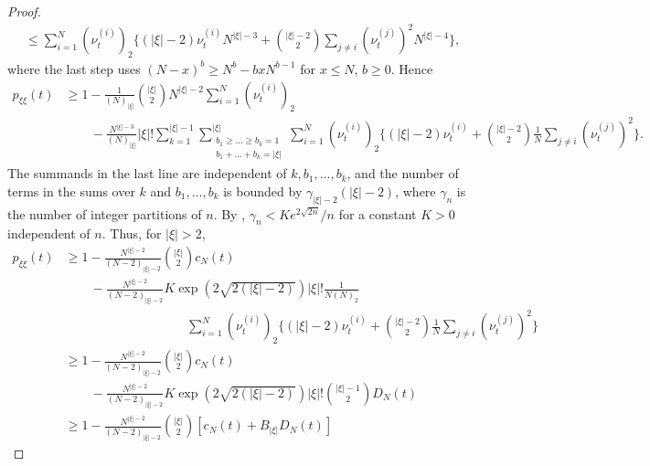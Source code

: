 \begin{proof}
\begin{align*}
&\leq \sum_{ i = 1 }^N ( \nu_t^{ ( i ) } )_2 \Bigg\{ ( | \xi | - 2 ) \nu_t^{ ( i ) } N^{ | \xi | - 3 } + \binom{ | \xi | - 2 }{ 2 } \sum_{ j \neq i } ( \nu_t^{ ( j ) } )^2 N^{ | \xi | - 4 } \Bigg\},
\end{align*}
where the last step uses $(N - x)^b \geq N^b - b x N^{ b - 1 }$ for $x \leq N$, $b \geq 0$.
Hence
\begin{align*}
p_{ \xi \xi }( t ) 
&\geq 1 - \frac{ 1 }{ ( N )_{ | \xi | } } \binom{|\xi|}{2}
        N^{ | \xi | - 2 } \sum_{ i = 1 }^N ( \nu_t^{ ( i ) } )_2 \\
    &\qquad- \frac{ N^{|\xi|-3} }{ ( N )_{ | \xi | } } |\xi|!
        \sum_{ k = 1 }^{ | \xi | - 1 } 
        \sum_{ \substack{ b_1 \geq \ldots \geq b_k = 1 
        \\ b_1 + \ldots + b_k = | \xi | } }^{ | \xi | } 
        \sum_{ i = 1 }^N ( \nu_t^{ ( i ) } )_2 
        \Bigg\{ ( | \xi | - 2 ) \nu_t^{ ( i ) } + \binom{ | \xi | - 2 }{ 2 } \frac{1}{N} 
        \sum_{ j \neq i } ( \nu_t^{ ( j ) } )^2 \Bigg\} .
\end{align*}
The summands in the last line are independent of $k, b_1, \dots, b_k$, and the number of terms in the sums over $k$ and $b_1, \dots, b_k$ is bounded by $\gamma_{|\xi|-2} (|\xi|-2)$, where $\gamma_n$ is the number of integer partitions of $n$.
By \textcite[Section 2]{hardy1918}, $\gamma_n < K e^{ 2 \sqrt{ 2 n } } / n$ for a constant $K > 0$ independent of $n$.
Thus, for $|\xi| > 2$,
\begin{align*}
p_{ \xi \xi }( t ) 
&\geq 1 - \frac{ N^{ | \xi | - 2 } }{ ( N-2 )_{ | \xi | -2} } \binom{|\xi|}{2}
        c_N(t) \\
    &\qquad- \frac{ N^{|\xi|-2} }{ ( N-2 )_{ | \xi | -2} }
        K \exp( 2 \sqrt{2(|\xi|-2)} ) |\xi|!
        \frac{1}{N(N)_2} \\
    &\hspace{4cm} \sum_{ i = 1 }^N ( \nu_t^{ ( i ) } )_2
        \Bigg\{ ( | \xi | - 2 ) \nu_t^{ ( i ) } + \binom{ | \xi | - 2 }{ 2 } \frac{1}{N} 
        \sum_{ j \neq i } ( \nu_t^{ ( j ) } )^2 \Bigg\} \\
&\geq 1 - \frac{ N^{ | \xi | - 2 } }{ ( N-2 )_{ | \xi | -2} } \binom{|\xi|}{2}
        c_N(t) \\
    &\qquad- \frac{ N^{|\xi|-2} }{ ( N-2 )_{ | \xi | -2} }
        K \exp( 2 \sqrt{2(|\xi|-2)} ) |\xi|! \binom{ |\xi|-1}{2} D_N(t) \\
&\geq 1 - \frac{ N^{ | \xi | - 2 } }{ ( N-2 )_{ | \xi | -2} } \binom{|\xi|}{2}
        \left[ c_N(t) + B_{|\xi|} D_N(t) \right]
\end{align*}

\end{proof}
